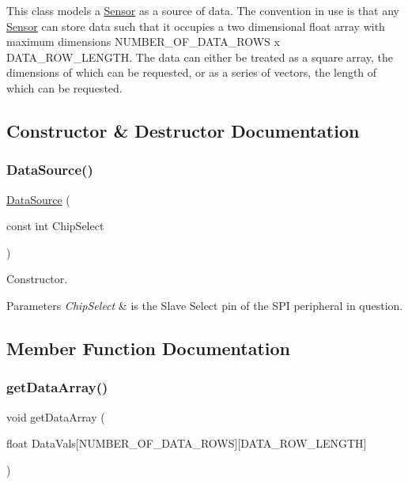 This class models a \mbox{\hyperlink{class_sensor}{Sensor}} as a source of data. The convention in use is that any \mbox{\hyperlink{class_sensor}{Sensor}} can store data such that it occupies a two dimensional float array with maximum dimensions N\+U\+M\+B\+E\+R\+\_\+\+O\+F\+\_\+\+D\+A\+T\+A\+\_\+\+R\+O\+WS x D\+A\+T\+A\+\_\+\+R\+O\+W\+\_\+\+L\+E\+N\+G\+TH. The data can either be treated as a square array, the dimensions of which can be requested, or as a series of \textquotesingle{}vectors\textquotesingle{}, the length of which can be requested. 

\subsection{Constructor \& Destructor Documentation}
\mbox{\label{class_data_source_a9c3258c608e4fdf9436e8cd32d677e7d}} 
\subsubsection{\texorpdfstring{DataSource()}{DataSource()}}
{\footnotesize\ttfamily \mbox{\hyperlink{class_data_source}{Data\+Source}} (\begin{DoxyParamCaption}\item[{const int}]{Chip\+Select }\end{DoxyParamCaption})}



Constructor. 


\begin{DoxyParams}{Parameters}
{\em Chip\+Select} & is the Slave Select pin of the S\+PI peripheral in question. \\
\hline
\end{DoxyParams}


\subsection{Member Function Documentation}
\mbox{\label{class_data_source_a83bdf3c6a0c54d468dad3e73509c90e6}} 
\subsubsection{\texorpdfstring{getDataArray()}{getDataArray()}}
{\footnotesize\ttfamily void get\+Data\+Array (\begin{DoxyParamCaption}\item[{float}]{Data\+Vals\mbox{[}\+N\+U\+M\+B\+E\+R\+\_\+\+O\+F\+\_\+\+D\+A\+T\+A\+\_\+\+R\+O\+W\+S\mbox{]}\mbox{[}\+D\+A\+T\+A\+\_\+\+R\+O\+W\+\_\+\+L\+E\+N\+G\+T\+H\mbox{]} }\end{DoxyParamCaption})}



